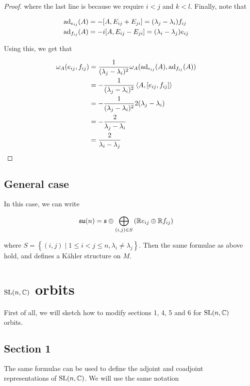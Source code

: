 \documentclass{article}
\newcommand{\su}{\mathfrak{su}}
\begin{document}
\begin{proof}
where the last line is because we require \(i < j\) and \(k < l\). Finally, note that

\begin{align*}
    \operatorname{ad}_{e_{ij}}(A) &= -[A, E_{ij} + E_{ji}] = (\lambda_j - \lambda_i)f_{ij} \\
    \operatorname{ad}_{f_{ij}}(A) &= -i[A, E_{ij} - E_{ji}] = (\lambda_i - \lambda_j)e_{ij}
\end{align*}

Using this, we get that

\begin{align*}
    \omega_A(e_{ij}, f_{ij}) &= \frac{1}{(\lambda_j - \lambda_i)^2}\omega_A(\operatorname{ad}_{e_{ij}}(A), \operatorname{ad}_{f_{ij}}(A)) \\
    &= -\frac{1}{(\lambda_j - \lambda_i)^2}\left\langle A, [e_{ij}, f_{ij}] \right\rangle \\
    &= -\frac{1}{(\lambda_j - \lambda_i)^2}2(\lambda_j - \lambda_i) \\
    &= -\frac{2}{\lambda_j - \lambda_i} \\
    &= \frac{2}{\lambda_i - \lambda_j}
\end{align*}

\end{proof}

\subsection{General case}

In this case, we can write

\[\su(n) = \mfs \oplus \bigoplus_{(i, j) \in S}\left(\R e_{ij} \oplus \R f_{ij}\right)\]

where \(S = \left\{(i, j) \mid 1 \le i < j \le n, \lambda_i \ne \lambda_j\right\}\). Then the same formulae as above hold, and defines a K\"ahler structure on \(M\). 

\section{\(\operatorname{SL}(n, \mathbb{C})\) orbits}

First of all, we will sketch how to modify sections 1, 4, 5 and 6 for \(\operatorname{SL}(n, \mathbb{C})\) orbits.

\subsection*{Section 1}

The same formulae can be used to define the adjoint and coadjoint representations of \(\operatorname{SL}(n, \mathbb{C})\). We will use the same notation
\end{document}
